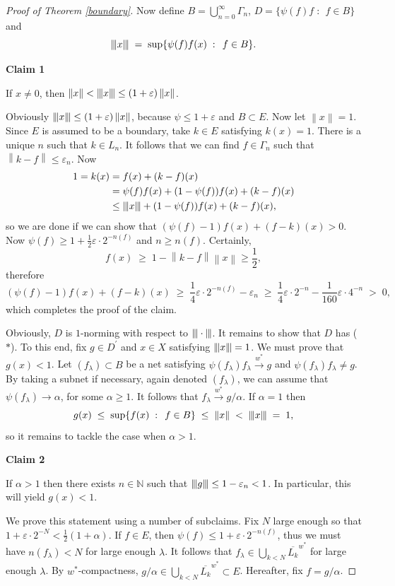 \documentclass[12pt,a4paper]{amsart}
\theoremstyle{definition}
\theoremstyle{remark}
\newcommand{\cl}[1]{\ensuremath{\overline{{#1}}}}
\newcommand{\eps}{\ensuremath{\varepsilon}}
\newcommand{\n}[1]{\ensuremath{\left\|{#1}\right\|}}
\newcommand{\N}{\mathbb{N}}
\newcommand{\set}[2]{\{{#1} \;:\;\, {#2}\}}
\newcommand{\st}{($*$)}
\newcommand{\tri}{{\displaystyle |\kern-.9pt|\kern-.9pt|}}
\newcommand{\tn}[1]{\ensuremath{\tri{#1}\tri}}
\newcommand{\tndot}{\ensuremath{\tri\cdot\tri}}
\begin{document}
\begin{proof}[Proof of Theorem \ref{boundary}]
Now define $B = \bigcup_{n=0}^\infty \Gamma_n$, $D =
\set{\psi(f)f}{f \in B}$ and
\[
\tn{x} \;=\; \sup\set{\psi(f)f(x)}{f \in B}.
\]

\textbf{Claim 1}

If $x \neq 0$, then $\n{x} < \tn{x} \leq (1 + \eps)\n{x}$.

Obviously $\tn{x} \leq (1 + \eps)\n{x}$, because $\psi \leq 1
+ \eps$ and $B \subset E$. Now let $\n{x} = 1$. Since $E$ is
assumed to be a boundary, take $k \in E$ satisfying $k(x) = 1$.
There is a unique $n$ such that $k \in L_n$. It follows that we can
find $f \in \Gamma_n$ such that $\n{k-f} \leq \eps_n$. Now
\begin{align*}
1 = k(x) &= f(x) + (k-f)(x)\\
&= \psi(f)f(x) + (1-\psi(f))f(x) + (k-f)(x)\\
&\leq \tn{x} + (1-\psi(f))f(x) + (k-f)(x),
\end{align*}
so we are done if we can show that $(\psi(f)-1)f(x) + (f-k)(x) > 0$.
Now $\psi(f) \geq 1 + \frac{1}{2}\eps\cdot 2^{-n(f)}$ and $n\geq
n(f)$. Certainly,
\[
f(x) \;\geq\; 1 - \n{k-f}\n{x} \geq {\textstyle \frac{1}{2}},
\]
therefore
\[
(\psi(f)-1)f(x) + (f-k)(x) \;\geq\; {\textstyle \frac{1}{4}}\eps\cdot
2^{-n(f)} - \eps_n \;\geq\; {\textstyle \frac{1}{4}}\eps\cdot 2^{-n} -
{\textstyle \frac{1}{160}}\eps\cdot 4^{-n} \;>\; 0,
\]
which completes the proof of the claim.

Obviously, $D$ is $1$-norming with respect to $\tndot$. It
remains to show that $D$ has {\st}. To this end, fix $g \in
D^\prime$ and $x\in X$ satisfying $\tn{x} = 1$. We must prove
that $g(x) < 1$. Let $(f_\lambda) \subset B$ be a net satisfying
$\psi(f_\lambda)f_\lambda \stackrel{w^*}{\to} g$ and
$\psi(f_\lambda)f_\lambda \neq g$. By taking a subnet if necessary,
again denoted $(f_\lambda)$, we can assume that $\psi(f_\lambda) \to
\alpha$, for some $\alpha \geq 1$. It follows that $f_\lambda
\stackrel{w^*}{\to} g/\alpha$. If $\alpha=1$ then
\[
g(x) \;\leq\; \sup\set{f(x)}{f \in B} \;\leq\; \n{x} \;<\;
\tn{x} \;=\; 1,
\]
so it remains to tackle the case when $\alpha > 1$.

\textbf{Claim 2}

If $\alpha > 1$ then there exists $n \in \N$ such that
$\tn{g} \leq 1 - \eps_n < 1$. In particular, this will yield
$g(x)<1$.

We prove this statement using a number of subclaims. Fix $N$ large
enough so that $1+\eps\cdot 2^{-N} < \frac{1}{2}(1+\alpha)$. If $f
\in E$, then $\psi(f) \leq 1 + \eps\cdot 2^{-n(f)}$, thus we must
have $n(f_\lambda) < N$ for large enough $\lambda$. It follows that
$f_\lambda \in \bigcup_{k<N} \cl{L_k}^{w^*}$ for large enough
$\lambda$. By $w^*$-compactness, $g/\alpha \in \bigcup_{k<N}
\cl{L_k}^{w^*} \subset E$. Hereafter, fix $f = g/\alpha$.


\end{proof}
\end{document}
